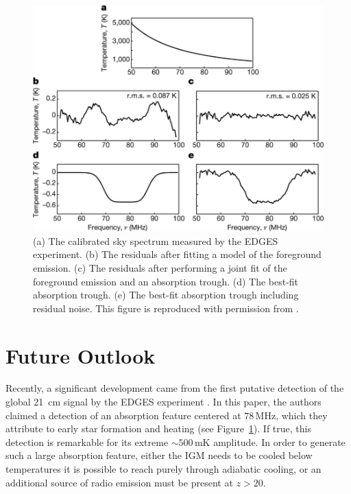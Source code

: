 \begin{bibunit}
\begin{figure}[t]
    \centering
    \includegraphics[width=\textwidth]{figures/chapter1/bowman-2018-absorption-trough}
    \caption{
        (a) The calibrated sky spectrum measured by the EDGES experiment.
        (b) The residuals after fitting a model of the foreground emission.
        (c) The residuals after performing a joint fit of the foreground emission and an absorption
        trough.
        (d) The best-fit absorption trough.
        (e) The best-fit absorption trough including residual noise.
        This figure is reproduced with permission from \citet{2018Natur.555...67B}.
    }
    \label{fig:bowman-absorption-trough}
\end{figure}



\section{Future Outlook}

Recently, a significant development came from the first putative detection of the global 21~cm
signal by the EDGES experiment \citep{2018Natur.555...67B}. In this paper, the authors claimed a
detection of an absorption feature centered at $78\,\text{MHz}$, which they attribute to early star
formation and heating (see Figure~\ref{fig:bowman-absorption-trough}). If true, this detection is
remarkable for its extreme $\sim500\,\text{mK}$ amplitude. In order to generate such a large
absorption feature, either the IGM needs to be cooled below temperatures it is possible to reach
purely through adiabatic cooling, or an additional source of radio emission must be present at $z >
20$.



\end{bibunit}
